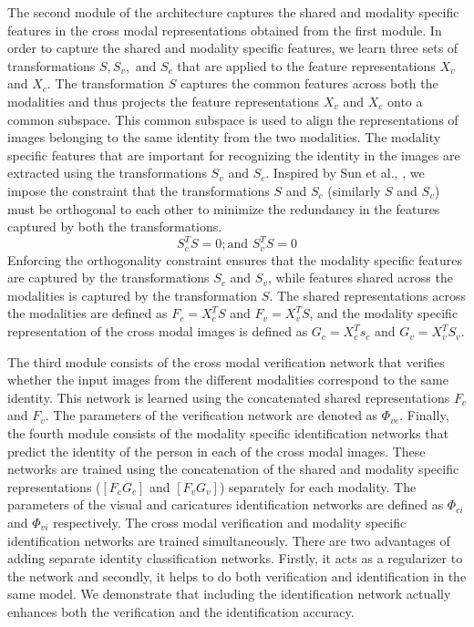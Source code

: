 The second module of the architecture captures the shared and modality specific features in the cross modal representations obtained from the first module. In order to capture the shared and modality specific features, we learn three sets of transformations {$S,S_v,$ and $S_c$} that are applied to the feature representations $X_v$ and $X_c$. The transformation $S$ captures the common features across both the modalities and thus projects the feature representations $X_v$ and $X_c$ onto a common subspace. This common subspace is used to align the representations of images belonging to the same identity from the two modalities. The modality specific features that are important for recognizing the identity in the images are extracted using the transformations $S_v$ and $S_c$. Inspired by Sun et al., \cite{AAAI_2017}, we impose the constraint that the transformations $S$ and $S_c$ (similarly $S$ and $S_v$) must be orthogonal to each other to minimize the redundancy in the features captured by both the transformations.
\begin{equation}
    S_c^T S = 0; \mbox{and }  S_v^T S = 0
\end{equation}
Enforcing the orthogonality constraint ensures that the modality specific features are captured by the transformations $S_c$ and $S_v$, while features shared across the modalities is captured by the transformation $S$. The shared representations across the modalities are defined as $F_c= X_c^T S$ and $F_v = X_v^T S$, and the modality specific representation of the cross modal images is defined as $G_c = X_c^Ts_c$ and $G_v = X_v^T S_v$.


The third module consists of the cross modal verification network that verifies whether the input images from the different modalities correspond to the same identity. This network is learned using the concatenated shared representations $F_c$ and $F_v$. The parameters of the verification network are denoted as $\Phi_{ve}$. Finally, the fourth module consists of the  modality specific identification networks that predict the identity of the person in each of the cross modal images. These networks are trained using the concatenation of the shared and modality specific representations ($[F_c G_c]$ and $[F_v G_v]$) separately for each modality. The parameters of the visual and caricatures identification networks are defined as $\Phi_{ci}$ and $\Phi_{vi}$ respectively. The cross modal verification and modality specific identification networks are trained simultaneously. 
There are two advantages of adding separate identity classification networks. Firstly, it acts as a regularizer to the network  \cite{inception} and secondly, it helps to do both verification and identification in the same model. We demonstrate that including the identification network actually enhances both the verification and the identification accuracy.

